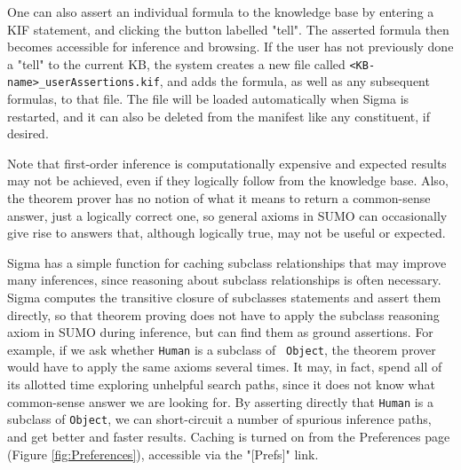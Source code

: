 \documentclass{book}
\begin{document}
One can also assert an individual formula to the knowledge base by entering a
KIF statement, and clicking the button labelled "tell".  The asserted
formula then becomes accessible for inference and browsing.  If the user has not
previously done a "tell" to the current KB, the system creates a new file
called \texttt{<KB-name>_userAssertions.kif}, and adds the formula, as well as any
subsequent formulas, to that file.  The file will be loaded automatically when
Sigma is restarted, and it can also be deleted from the manifest like any
constituent, if desired.

Note that first-order inference is computationally expensive and expected
results may not be achieved, even if they logically follow from the knowledge
base.  Also, the theorem prover has no notion of what it means to return a
common-sense answer, just a logically correct one, so general axioms in SUMO can
occasionally give rise to answers that, although logically true, may not be
useful or expected.

Sigma has a simple function for caching subclass relationships that may improve
many inferences, since reasoning about subclass relationships is often
necessary.  Sigma computes the transitive closure of subclasses statements
and assert them directly, so that theorem proving does not have to apply the subclass
reasoning axiom in SUMO during inference, but can find them as ground
assertions.  For example, if we ask whether {\tt Human} is a subclass of {\tt
Object}, the theorem prover would have to apply the same axioms several times.  It may, in
fact, spend all of its allotted time exploring unhelpful search paths, since it
does not know what common-sense answer we are looking for.  By asserting
directly that {\tt Human} is a subclass of {\tt Object}, we can short-circuit a
number of spurious inference paths, and get better and faster results.
Caching is turned on from the Preferences page
(Figure \ref{fig:Preferences}), accessible via the
"[Prefs]" link.
\end{document}
